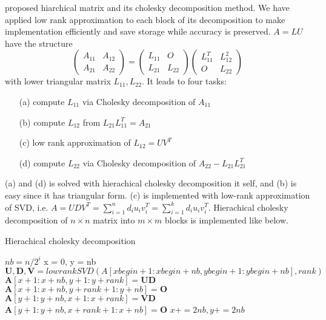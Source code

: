 \citet{hackbusch2015hierarchical} proposed hiarchical matrix and its cholesky decomposition method. We have applied low rank approximation to each block of its decomposition to make implementation efficiently and save storage while accuracy is preserved.
$A=LU$have the structure
$$\begin{pmatrix}A_{11}&A_{12}\\A_{21}&A_{22}\end{pmatrix}=\begin{pmatrix}L_{11}&O\\L_{21}&L_{22}\end{pmatrix}\begin{pmatrix}L_{11}^T&L_{12}^2\\O&L_{22}\end{pmatrix}$$
with lower triangular matrix $L_{11},L_{22}$.
It leads to four tasks:
\begin{itemize}
	\item[(a)] compute $L_{11}$ via Cholesky decomposition of $A_{11}$
	\item[(b)] compute $L_{12}$ from $L_{21}L_{11}^T = A_{21}$
	\item[(c)] low rank approximation of $L_{12}=UV^T$
	\item[(d)] compute $L_{22}$ via Cholesky decomposition of $A_{22}-L_{21}L_{21}^T$
\end{itemize}
(a) and (d) is solved with hierachical cholesky decomposition it self, and (b) is easy since it has triangular form. (c) is implemented with low-rank approximation of SVD, i.e. $A=UDV^T=\sum_{i=1}^n d_i u_iv_i^T=\sum_{i=1}^k d_i u_iv_i^T$.
Hierachical cholesky decomposition of $n\times n$ matrix into $m\times m$ blocks is implemented like below.
\begin{algorithm}[H]
	\caption{Hierachical cholesky decomposition}
	\begin{algorithmic}[1]
		\State $nb = n/2^i$
		\State x = 0, y = nb
		\State $\mathbf{U,D,V} = lowrankSVD(A[xbegin+1:xbegin+nb,ybegin+1:ybegin+nb], rank)$
		\State $\mathbf{A}[x + 1:x + nb, y + 1:y + rank] = \mathbf{UD}$
		\State $\mathbf{A}[x + 1:x + nb, y + rank+1:y + nb] = \mathbf{O}$
		\State $\mathbf{A}[y + 1:y + nb, x + 1:x + rank] = \mathbf{VD}$
		\State $\mathbf{A}[y + 1:y + nb, x + rank+1:x + nb] = \mathbf{O}$
		\State $x += 2nb, y += 2nb$
		\EndFor
		\EndFor
		\EndProcedure
		
	\end{algorithmic}\label{alg:hchol}
\end{algorithm}


